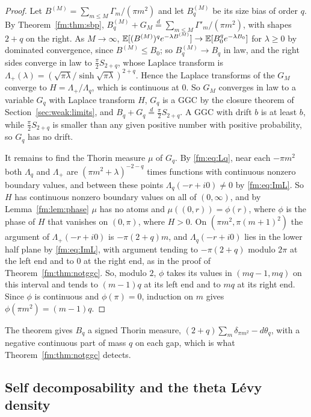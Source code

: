 \begin{proof}
Let $B^{(M)}=\sum_{m\le M}\Gamma_m/(\pi m^2)$ and let $B^{(M)}_q$ be its size bias of order $q$. By Theorem~\ref{fm:thm:sbp}, $B^{(M)}_q+G_M\overset d=\sum_{m\le M}\Gamma'_m/(\pi m^2)$, with shapes $2+q$ on the right. As $M\to\infty$, $\mathbb{E}[(B^{(M)})^qe^{-\lambda B^{(M)}}]\to\mathbb{E}[B_0^qe^{-\lambda B_0}]$ for $\lambda\ge0$ by dominated convergence, since $B^{(M)}\le B_0$; so $B^{(M)}_q\to B_q$ in law, and the right sides converge in law to $\frac\pi2S_{2+q}$, whose Laplace transform is $\Lambda_+(\lambda)=(\sqrt{\pi\lambda}/\sinh\sqrt{\pi\lambda})^{2+q}$. Hence the Laplace transforms of the $G_M$ converge to $H=\Lambda_+/\Lambda_q$, which is continuous at $0$. So $G_M$ converges in law to a variable $G_q$ with Laplace transform $H$, $G_q$ is a GGC by the closure theorem of Section~\ref{sec:weak:limits}, and $B_q+G_q\overset d=\frac\pi2S_{2+q}$. A GGC with drift $b$ is at least $b$, while $\frac\pi2S_{2+q}$ is smaller than any given positive number with positive probability, so $G_q$ has no drift.

It remains to find the Thorin measure $\mu$ of $G_q$. By \eqref{fm:eq:Lq}, near each $-\pi m^2$ both $\Lambda_q$ and $\Lambda_+$ are $(\pi m^2+\lambda)^{-2-q}$ times functions with continuous nonzero boundary values, and between these points $\Lambda_q(-r+i0)\ne0$ by \eqref{fm:eq:ImL}. So $H$ has continuous nonzero boundary values on all of $(0,\infty)$, and by Lemma~\ref{fm:lem:phase} $\mu$ has no atoms and $\mu((0,r))=\phi(r)$, where $\phi$ is the phase of $H$ that vanishes on $(0,\pi)$, where $H>0$. On $(\pi m^2,\pi(m+1)^2)$ the argument of $\Lambda_+(-r+i0)$ is $-\pi(2+q)m$, and $\Lambda_q(-r+i0)$ lies in the lower half plane by \eqref{fm:eq:ImL}, with argument tending to $-\pi(2+q)$ modulo $2\pi$ at the left end and to $0$ at the right end, as in the proof of Theorem~\ref{fm:thm:notggc}. So, modulo $2$, $\phi$ takes its values in $(mq-1,mq)$ on this interval and tends to $(m-1)q$ at its left end and to $mq$ at its right end. Since $\phi$ is continuous and $\phi(\pi)=0$, induction on $m$ gives $\phi(\pi m^2)=(m-1)q$.
\end{proof}

The theorem gives $B_q$ a signed Thorin measure, $(2+q)\sum_m\delta_{\pi m^2}-d\theta_q$, with a negative continuous part of mass $q$ on each gap, which is what Theorem~\ref{fm:thm:notggc} detects.

\subsection{Self decomposability and the theta L\'evy density}\label{fm:sec:sd}

